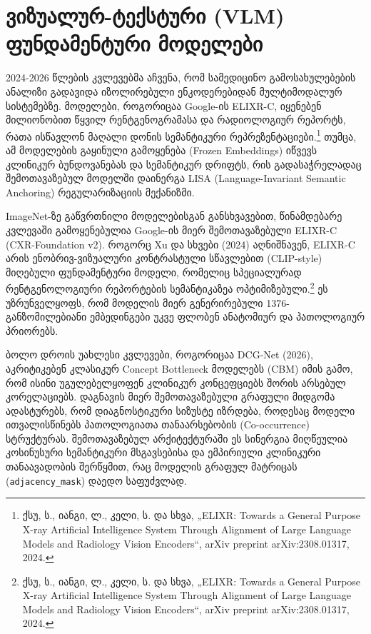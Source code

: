 \documentclass[12pt,a4paper,oneside]{report}
\begin{document}
\section{ვიზუალურ-ტექსტური (VLM) ფუნდამენტური მოდელები}
2024-2026 წლების კვლევებმა აჩვენა, რომ სამედიცინო გამოსახულებების ანალიზი გადავიდა იზოლირებული ენკოდერებიდან მულტიმოდალურ სისტემებზე. მოდელები, როგორიცაა Google-ის ELIXR-C, იყენებენ მილიონობით წყვილ რენტგენოგრამასა და რადიოლოგიურ რეპორტს, რათა ისწავლონ მაღალი დონის სემანტიკური რეპრეზენტაციები.\footnote{ქსუ, ს., იანგი, ლ., კელი, ს. და სხვა, „ELIXR: Towards a General Purpose X-ray Artificial Intelligence System Through Alignment of Large Language Models and Radiology Vision Encoders“, arXiv preprint arXiv:2308.01317, 2024.} თუმცა, ამ მოდელების გაყინული გამოყენება (Frozen Embeddings) იწვევს კლინიკურ ბუნდოვანებას და სემანტიკურ დრიფტს, რის გადასაჭრელადაც შემოთავაზებულ მოდელში დაინერგა LISA (Language-Invariant Semantic Anchoring) რეგულარიზაციის მექანიზმი.

ImageNet-ზე გაწვრთნილი მოდელებისგან განსხვავებით, წინამდებარე კვლევაში გამოყენებულია Google-ის მიერ შემოთავაზებული ELIXR-C (CXR-Foundation v2). როგორც Xu და სხვები (2024) აღნიშნავენ, ELIXR-C არის ენობრივ-ვიზუალური კონტრასტული სწავლებით (CLIP-style) მიღებული ფუნდამენტური მოდელი, რომელიც სპეციალურად რენტგენოლოგიური რეპორტების სემანტიკაზეა ოპტიმიზებული.\footnote{ქსუ, ს., იანგი, ლ., კელი, ს. და სხვა, „ELIXR: Towards a General Purpose X-ray Artificial Intelligence System Through Alignment of Large Language Models and Radiology Vision Encoders“, arXiv preprint arXiv:2308.01317, 2024.} ეს უზრუნველყოფს, რომ მოდელის მიერ გენერირებული 1376-განზომილებიანი ემბედინგები უკვე ფლობენ ანატომიურ და პათოლოგიურ პრიორებს.

ბოლო დროის უახლესი კვლევები, როგორიცაა DCG-Net (2026), აკრიტიკებენ კლასიკურ Concept Bottleneck მოდელებს (CBM) იმის გამო, რომ ისინი უგულებელყოფენ კლინიკურ კონცეფციებს შორის არსებულ კორელაციებს. დაგნავის მიერ შემოთავაზებული გრაფული მიდგომა ადასტურებს, რომ დიაგნოსტიკური სიზუსტე იზრდება, როდესაც მოდელი ითვალისწინებს პათოლოგიათა თანაარსებობის (Co-occurrence) სტრუქტურას. შემოთავაზებულ არქიტექტურაში ეს სინერგია მიღწეულია კოსინუსური სემანტიკური მსგავსებისა და ემპირიული კლინიკური თანაავადობის შერწყმით, რაც მოდელის გრაფულ მატრიცას (\texttt{adjacency\_mask}) დაედო საფუძვლად.
\end{document}
